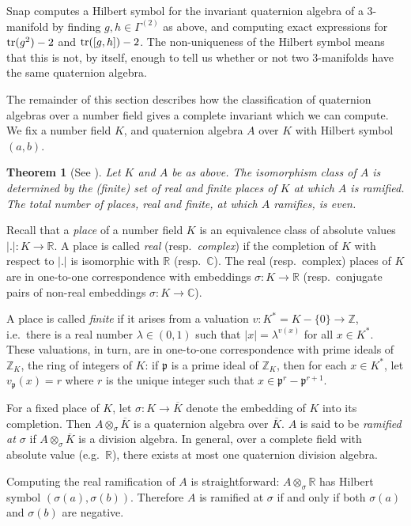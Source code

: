 \documentclass[a4paper]{amsart}
\def\Z{{\mathbb Z}}
\def\R{{\mathbb R}}
\def\C{{\mathbb C}}
\def\tr{\mbox{\rm tr}}
\def\p{{\mathfrak p}}
\newtheorem{theorem}{Theorem}[section]
\theoremstyle{definition}
\begin{document}
Snap computes a Hilbert symbol for the invariant quaternion algebra of
a 3-manifold by finding $g,h\in \Gamma^{(2)}$ as above, and computing
exact expressions for $\tr(g^2) - 2$ and $\tr([g,h]) - 2$. The
non-uniqueness of the Hilbert symbol means that this is not, by itself,
enough to tell us whether or not two 3-manifolds have the same
quaternion algebra. 

The remainder of this section describes how the classification of
quaternion algebras over a number field gives a complete invariant
which we can compute. 
We fix a number field $K$, and quaternion algebra $A$ over
$K$ with Hilbert symbol $(a,b)$.


\begin{theorem}[See \cite{vigneras}]
Let $K$ and $A$ be as above. The
isomorphism class of $A$ is determined by the (finite) set of real and
finite places of $K$ at which $A$ is ramified. The total number of
places, real and finite, at which $A$ ramifies, is even. 
\end{theorem}

Recall that a {\em place} of a number field $K$ is an equivalence
class of absolute values $|.|:K\rightarrow \R$. A place is called {\em real}
(resp.\ {\em complex}) if the completion of $K$ with respect to $|.|$ is
isomorphic with $\R$ (resp.\ $\C$). The real (resp.\ complex) places
of $K$ are in one-to-one correspondence with embeddings
$\sigma:K\rightarrow \R$ (resp.\ conjugate pairs of non-real embeddings
$\sigma:K\rightarrow \C$). 

A place is called {\em finite} if it arises from a valuation
$v:K^*=K-\{ 0\} \rightarrow \Z$, 
i.e.\ there is a real number $\lambda \in (0,1)$
such that $|x| = \lambda^{v(x)}$ for all $x\in K^*$.
These valuations, in turn, are in one-to-one correspondence with
prime ideals of $\Z_K$, the ring of integers of $K$: if $\p$ is a
prime ideal of $\Z_K$, then for each $x\in K^*$, let $v_{\p}(x) = r$ where $r$
is the unique integer such that $x\in \p^r - \p^{r+1}$. 

\def\Kbar{\overline{K}}

For a fixed place of $K$, let $\sigma:K\rightarrow \Kbar$ denote the
embedding of $K$ into its completion. Then $A\otimes_{\sigma}\Kbar$ is
a quaternion algebra over $\Kbar$.  $A$ is said to be {\em ramified at
$\sigma$} if $A\otimes_{\sigma}\Kbar$ is a division algebra. In
general, over a complete field with absolute value (e.g.\ $\R$), there
exists at most one quaternion division algebra.

Computing the real ramification of $A$ is straightforward:
$A\otimes_{\sigma}\R$ has Hilbert symbol $(\sigma(a),
\sigma(b))$. Therefore $A$ is ramified at $\sigma$ if and only if both
$\sigma(a)$ and $\sigma(b)$ are negative.
\end{document}
